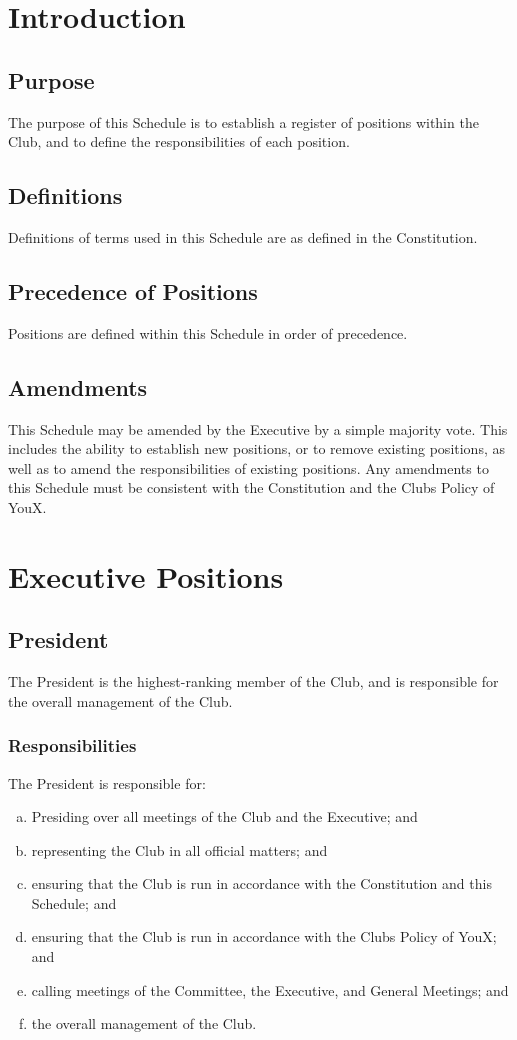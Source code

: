 \documentclass[11pt]{report}
\begin{document}

\tableofcontents

\chapter{Introduction}
\section{Purpose}
The purpose of this Schedule is to establish a register of positions within the Club, and to define the responsibilities of each position.
\section{Definitions}
Definitions of terms used in this Schedule are as defined in the Constitution.
\section{Precedence of Positions}
Positions are defined within this Schedule in order of precedence.
\section{Amendments}
This Schedule may be amended by the Executive by a simple majority vote. This includes the ability to establish new positions, or to remove existing positions, as well as to amend the responsibilities of existing positions. Any amendments to this Schedule must be consistent with the Constitution and the Clubs Policy of YouX.

\chapter{Executive Positions}\label{executive}
\section{President}
The President is the highest-ranking member of the Club, and is responsible for the overall management of the Club.
\subsection{Responsibilities}
The President is responsible for:
\begin{enumerate}[(a)]
    \item Presiding over all meetings of the Club and the Executive; and
    \item representing the Club in all official matters; and
    \item ensuring that the Club is run in accordance with the Constitution and this Schedule; and
    \item ensuring that the Club is run in accordance with the Clubs Policy of YouX; and
    \item calling meetings of the Committee, the Executive, and General Meetings; and
    \item the overall management of the Club.
\end{enumerate}
\end{document}
